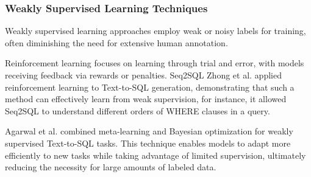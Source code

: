 \subsubsection{Weakly Supervised Learning Techniques}

Weakly supervised learning approaches employ weak or noisy labels for training, often diminishing the need for extensive human annotation.


Reinforcement learning focuses on learning through trial and error, with models receiving feedback via rewards or penalties. Seq2SQL Zhong et al. \cite{zhong_seq2sql_2017} applied reinforcement learning to Text-to-SQL generation, demonstrating that such a method can effectively learn from weak supervision, for instance, it allowed Seq2SQL to understand different orders of WHERE clauses in a query.


Agarwal et al. \cite{pmlr-v97-agarwal19e} combined meta-learning and Bayesian optimization for weakly supervised Text-to-SQL tasks. This technique enables models to adapt more efficiently to new tasks while taking advantage of limited supervision, ultimately reducing the necessity for large amounts of labeled data.